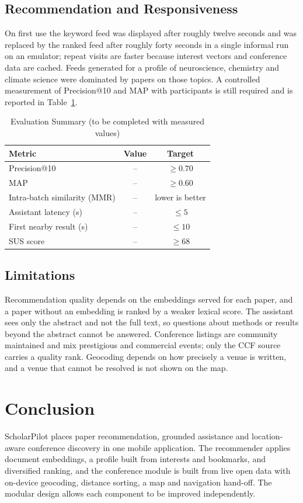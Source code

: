 \documentclass[conference]{IEEEtran}
\begin{document}
\subsection{Recommendation and Responsiveness}
On first use the keyword feed was displayed after roughly twelve seconds and was replaced by the ranked feed after roughly forty seconds in a single informal run on an emulator; repeat visits are faster because interest vectors and conference data are cached. Feeds generated for a profile of neuroscience, chemistry and climate science were dominated by papers on those topics. A controlled measurement of Precision@10 and MAP with participants is still required and is reported in Table~\ref{tab:results}.

\begin{table}[!t]
\caption{Evaluation Summary (to be completed with measured values)}
\label{tab:results}
\centering
\begin{tabular}{@{}lcc@{}}
\toprule
\textbf{Metric} & \textbf{Value} & \textbf{Target} \\
\midrule
Precision@10         & -- & $\geq 0.70$ \\
MAP                  & -- & $\geq 0.60$ \\
Intra-batch similarity (MMR) & -- & lower is better \\
Assistant latency (s) & -- & $\leq 5$ \\
First nearby result (s) & -- & $\leq 10$ \\
SUS score            & -- & $\geq 68$ \\
\bottomrule
\end{tabular}
\end{table}

\subsection{Limitations}
Recommendation quality depends on the embeddings served for each paper, and a paper without an embedding is ranked by a weaker lexical score. The assistant sees only the abstract and not the full text, so questions about methods or results beyond the abstract cannot be answered. Conference listings are community maintained and mix prestigious and commercial events; only the CCF source carries a quality rank. Geocoding depends on how precisely a venue is written, and a venue that cannot be resolved is not shown on the map.

\section{Conclusion}
ScholarPilot places paper recommendation, grounded assistance and location-aware conference discovery in one mobile application. The recommender applies document embeddings, a profile built from interests and bookmarks, and diversified ranking, and the conference module is built from live open data with on-device geocoding, distance sorting, a map and navigation hand-off. The modular design allows each component to be improved independently.
\end{document}

